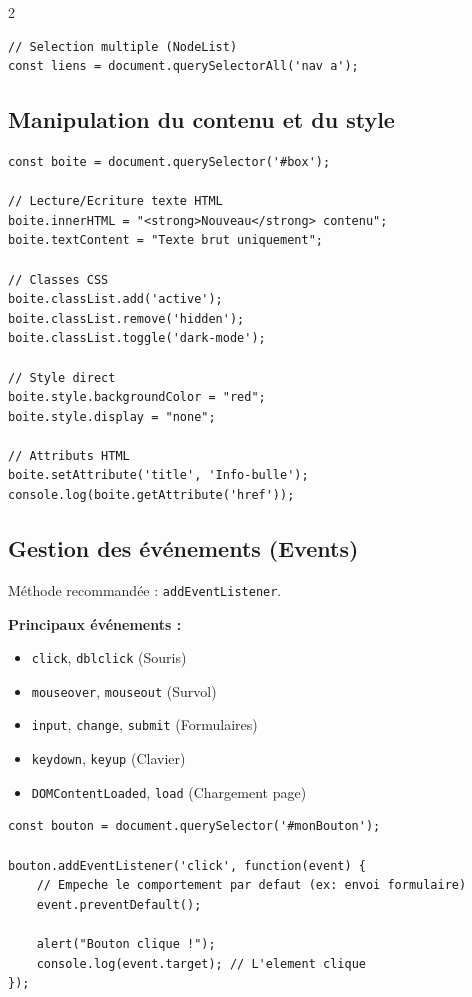 \documentclass[11pt,a4paper]{article}
\begin{document}
\begin{multicols*}{2}
\begin{lstlisting}
// Selection multiple (NodeList)
const liens = document.querySelectorAll('nav a');
\end{lstlisting}

\subsection{Manipulation du contenu et du style}
\begin{lstlisting}
const boite = document.querySelector('#box');

// Lecture/Ecriture texte HTML
boite.innerHTML = "<strong>Nouveau</strong> contenu";
boite.textContent = "Texte brut uniquement";

// Classes CSS
boite.classList.add('active');
boite.classList.remove('hidden');
boite.classList.toggle('dark-mode');

// Style direct
boite.style.backgroundColor = "red";
boite.style.display = "none";

// Attributs HTML
boite.setAttribute('title', 'Info-bulle');
console.log(boite.getAttribute('href'));
\end{lstlisting}

\subsection{Gestion des événements (Events)}
Méthode recommandée : \texttt{addEventListener}.

\textbf{Principaux événements :}
\begin{itemize}
    \item \texttt{click}, \texttt{dblclick} (Souris)
    \item \texttt{mouseover}, \texttt{mouseout} (Survol)
    \item \texttt{input}, \texttt{change}, \texttt{submit} (Formulaires)
    \item \texttt{keydown}, \texttt{keyup} (Clavier)
    \item \texttt{DOMContentLoaded}, \texttt{load} (Chargement page)
\end{itemize}

\begin{lstlisting}
const bouton = document.querySelector('#monBouton');

bouton.addEventListener('click', function(event) {
    // Empeche le comportement par defaut (ex: envoi formulaire)
    event.preventDefault(); 
    
    alert("Bouton clique !");
    console.log(event.target); // L'element clique
});
\end{lstlisting}


\end{multicols*}
\end{document}

